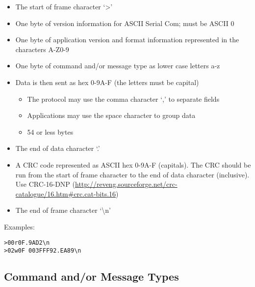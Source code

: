 \documentclass{customdocclass}
\begin{document}
\begin{itemize}
  \item The start of frame character `>'
  \item One byte of version information for ASCII Serial Com; must be ASCII 0
  \item One byte of application version and format information represented in the characters A-Z0-9
  \item One byte of command and/or message type as lower case letters a-z
  \item Data is then sent as hex 0-9A-F (the letters must be capital)
  \begin{itemize}
    \item The protocol may use the comma character `,' to separate fields
    \item Applications may use the space character to group data
    \item 54 or less bytes
  \end{itemize}
  \item The end of data character `.'
  \item A CRC code represented as ASCII hex 0-9A-F (capitals). The CRC should be run from the start of frame character to the end of data character (inclusive). Use CRC-16-DNP (\url{http://reveng.sourceforge.net/crc-catalogue/16.htm\#crc.cat-bits.16})
  \item The end of frame character `\textbackslash n'
\end{itemize}

Examples:

\begin{lstlisting}
>00r0F.9AD2\n
>02w0F 003FFF92.EA89\n
\end{lstlisting}

\subsection{Command and/or Message Types}
\end{document}
